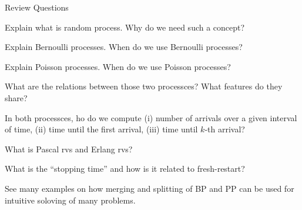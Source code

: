 \begin{frame}{Review Questions}

\bce[1)]
\item Explain what is random process. Why do we need such a concept?

\item Explain Bernoulli processes. When do we use Bernoulli processes?

\item Explain Poisson processes. When do we use Poisson processes?

\item What are the relations between those two processces? What features
  do they share?

  \item In both processces, ho do we compute (i) number of arrivals
    over a given interval of time, (ii) time until the first arrival,
    (iii) time until $k$-th arrival?

  \item What is Pascal rvs and Erlang rvs?
    
  \item What is the ``stopping time'' and how is it related to
    fresh-restart?

\item See many examples on how merging and splitting of BP and PP
  can be used for intuitive soloving of many problems.     

  \ece

\end{frame}






